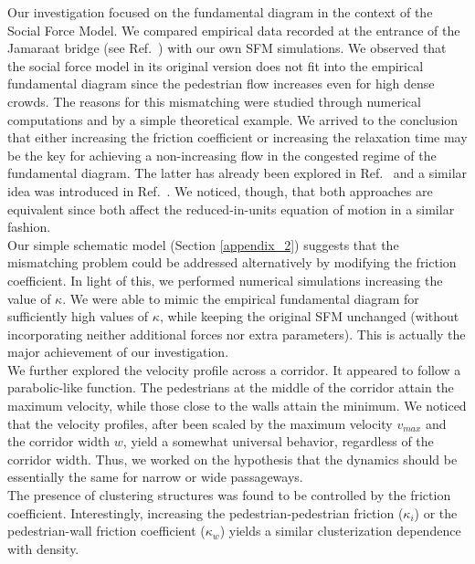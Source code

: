 \documentclass[preprint,12pt]{elsarticle}
\begin{document}
Our investigation focused on the fundamental diagram in the context of the 
Social Force Model. We compared empirical data recorded at 
the entrance of the Jamaraat bridge (see Ref.~\cite{helbing3}) with our own SFM 
simulations. We observed  that the  social force model in its 
original version does not fit into the empirical fundamental 
diagram since the pedestrian flow increases even for high dense 
crowds. The reasons for this mismatching were studied through 
numerical computations and by a simple theoretical example. We arrived to the 
conclusion that either increasing the friction coefficient or increasing the 
relaxation time may be the key for achieving a non-increasing 
flow in the congested regime of the fundamental diagram. The 
latter has already been explored in Ref.~\cite{johansson} and a 
similar idea was introduced in Ref.~\cite{parisi2}. We noticed, 
though, that both approaches are equivalent since both affect 
the reduced-in-units equation of motion in a similar fashion.\\

Our simple schematic model (Section \ref{appendix_2}) suggests 
that the mismatching problem could be addressed 
alternatively by  modifying the friction coefficient. In light 
of this, we performed numerical simulations increasing the 
value of $\kappa$. We were able to mimic the empirical 
fundamental diagram for sufficiently high values of $\kappa$, 
while keeping the original SFM unchanged (without incorporating neither additional forces nor extra parameters). 
This is actually the major achievement of our investigation. \\

We further explored the velocity profile 
across a corridor. It appeared to follow a parabolic-like 
function. The pedestrians at the middle of the 
corridor attain the maximum velocity, while those close to the 
walls attain the minimum. We noticed that the 
velocity profiles, after been scaled by the maximum velocity $v_{max}$ and the 
corridor width $w$, yield a somewhat universal behavior, 
regardless of the corridor width. Thus, we worked on the 
hypothesis that the dynamics should be essentially the same for narrow or wide 
passageways. \\

The presence of clustering structures was found to be controlled 
by the friction coefficient. Interestingly, increasing the 
pedestrian-pedestrian friction ($\kappa_i$) or the pedestrian-wall friction 
coefficient ($\kappa_w$) yields a similar clusterization dependence with 
density.\\
\end{document}
